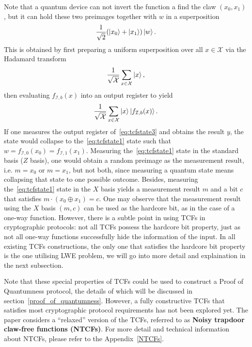 \documentclass[cryptography,review,submit,pdftex,moreauthors,amsmath,amssymb,aps,strict]{Definitions/mdpi}
\begin{document}
\noindent Note that a quantum device can not invert the function a find the claw $(x_0,x_1)$, but it can hold these two preimages together with $w$ in a superposition
\begin{align}
    \frac{1}{\sqrt{2}}(\ket{x_0}+\ket{x_1})\ket{w}.
    \label{eq:tcfstate1}
\end{align}
This is obtained by first preparing a uniform superposition over all $x\in\mathcal{X}$ via the Hadamard transform
\begin{align}
    \frac{1}{\sqrt{\mathcal{X}}}\sum_{x\in\mathcal{X}}\ket{x},
\end{align}
then evaluating $f_{\mathcal{I},b}(x)$ into an output register to yield 
\begin{align}
    \frac{1}{\sqrt{\mathcal{X}}}\sum_{x\in\mathcal{X}}\ket{x}\ket{f_{\mathcal{I},b}(x)}.\label{eq:tcfstate3}
\end{align}
If one measures the output register of~\eqref{eq:tcfstate3} and obtains the result $y$, the state would collapse to the~\eqref{eq:tcfstate1} state such that $w=f_{\mathcal{I},0}(x_0)=f_{\mathcal{I},1}(x_1)$.
Measuring the~\eqref{eq:tcfstate1} state in the standard basis ($Z$ basis), one would obtain a random preimage as the measurement result, i.e. $m=x_0$ or $m = x_1$, but not both, since measuring a quantum state means collapsing that state to one possible outcome. Besides, measuring the~\eqref{eq:tcfstate1} state in the $X$ basis yields a measurement result $m$ and a bit $c$ that satisfies $m \cdot (x_0\oplus x_1) = c$. One may observe that the measurement result using the $X$ basis $(m,c)$ can be used as the hardcore bit, as in the case of a one-way function. However, there is a subtle point in using TCFs in cryptographic protocols: not all TCFs possess the hardcore bit property, just as not all one-way functions successfully hide the information of the input. In all existing TCFs constructions, the only one that satisfies the hardcore bit property is the one utilising LWE problem, we will go into more detail and explaination in the next subsection.

Note that these special properties of TCFs could be used to construct a Proof of Quantumness protocol, the details of which will be discussed in section~\ref{proof_of_quantumness}. However, a fully constructive TCFs that satisfies most cryptographic protocol requirements has not been explored yet. The paper \cite{Brakerski18_Interactiveproofofquantumness} considers a ``relaxed'' version of the TCFs, referred to as \textbf{Noisy trapdoor claw-free functions (NTCFs)}. For more detail and technical information about NTCFs, please refer to the Appendix~\ref{NTCFs}.
\end{document}
